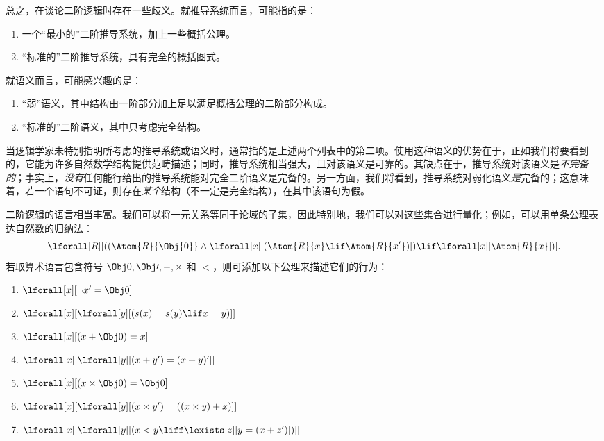 \documentclass[../../../include/open-logic-section]{subfiles}
\begin{document}
总之，在谈论二阶逻辑时存在一些歧义。就推导系统而言，可能指的是：

\begin{enumerate}
\item 一个“最小的”二阶推导系统，加上一些概括公理。
\item “标准的”二阶推导系统，具有完全的概括图式。
\end{enumerate}

就语义而言，可能感兴趣的是：

\begin{enumerate}
\item “弱”语义，其中结构由一阶部分加上足以满足概括公理的二阶部分构成。
\item “标准的”二阶语义，其中只考虑完全结构。
\end{enumerate}

当逻辑学家未特别指明所考虑的推导系统或语义时，通常指的是上述两个列表中的第二项。使用这种语义的优势在于，正如我们将要看到的，它能为许多自然数学结构提供范畴描述；同时，推导系统相当强大，且对该语义是可靠的。其缺点在于，推导系统对该语义是\emph{不完备的}；事实上，\emph{没有}任何能行给出的推导系统能对完全二阶语义是完备的。另一方面，我们将看到，推导系统对弱化语义\emph{是}完备的；这意味着，若一个语句不可证，则存在\emph{某个}结构（不一定是完全结构），在其中该语句为假。

二阶逻辑的语言相当丰富。我们可以将一元关系等同于论域的子集，因此特别地，我们可以对这些集合进行量化；例如，可以用单条公理表达自然数的归纳法：
\[
\lforall[R][((\Atom{R}{\Obj{0}} \land \lforall[x][(\Atom{R}{x} \lif
    \Atom{R}{x'})]) \lif \lforall[x][\Atom{R}{x}])].
\]
若取算术语言包含符号 $\Obj 0, \Obj \prime, +, \times$ 和 $<$，则可添加以下公理来描述它们的行为：

\begin{enumerate}
\item $\lforall[x][\lnot x' = \Obj 0]$
\item $\lforall[x][\lforall[y][(s(x) = s(y) \lif x = y)]]$
\item $\lforall[x][(x + \Obj 0) = x]$
\item $\lforall[x][\lforall[y][(x + y') = (x + y)']]$
\item $\lforall[x][(x \times \Obj 0) = \Obj 0]$
\item $\lforall[x][\lforall[y][(x \times y') = ((x \times y) + x)]]$
\item $\lforall[x][\lforall[y][(x < y \liff \lexists[z][y = (x + z')])]]$
\end{enumerate}
\end{document}
